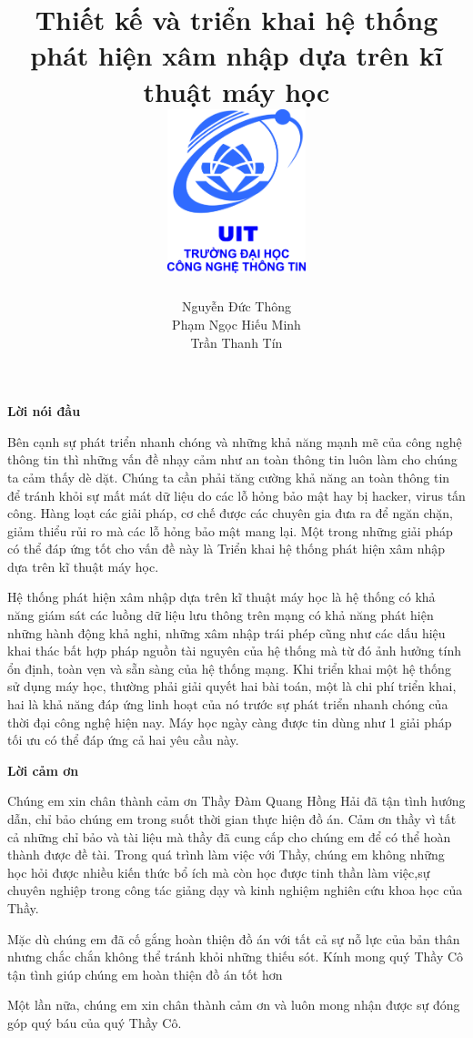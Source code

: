 \documentclass[12pt,twoside]{report}
\title{
    {Thiết kế và triển khai hệ thống phát hiện xâm nhập dựa trên kĩ thuật máy học}\\
    {\includegraphics[width=4cm]{logo}}
}
\author{
    Nguyễn Đức Thông
    \\
    Phạm Ngọc Hiếu Minh
    \\
    Trần Thanh Tín
}
\begin{document}

\newpage
\begin{center}
	{\LARGE \textbf{Lời nói đầu}}
\end{center}
Bên cạnh sự phát triển nhanh chóng và những khả năng mạnh mẽ của công nghệ thông tin thì những vấn đề nhạy cảm như
an toàn thông tin luôn làm cho chúng ta cảm thấy dè dặt. Chúng ta cần phải tăng cường khả năng an toàn thông tin để tránh
khỏi sự mất mát dữ liệu do các lỗ hỏng bảo mật hay bị hacker, virus tấn công. Hàng loạt các giải pháp, cơ chế được các
chuyên gia đưa ra để ngăn chặn, giảm thiểu rủi ro mà các lỗ hỏng bảo mật mang lại. Một trong những giải pháp có thể
đáp ứng tốt cho vấn đề này là Triển khai hệ thống phát hiện xâm nhập dựa trên kĩ thuật máy học.
\par
Hệ thống phát hiện xâm nhập dựa trên kĩ thuật máy học là hệ thống có khả năng giám sát các luồng dữ liệu lưu thông trên mạng
có khả năng phát hiện những hành động khả nghi, những xâm nhập trái phép cũng như các dấu hiệu khai thác bất hợp pháp
nguồn tài nguyên của hệ thống mà từ đó ảnh hưởng tính ổn định, toàn vẹn và sẵn sàng của hệ thống mạng.
Khi triển khai một hệ thống sử dụng máy học, thường phải giải quyết hai bài toán, một là chi phí triển khai,
hai là khả năng đáp ứng linh hoạt của nó trước sự phát triển nhanh chóng của thời đại công nghệ hiện nay.
Máy học ngày càng được tin dùng như 1 giải pháp tối ưu có thể đáp ứng cả hai yêu cầu này.
\newpage
\begin{center}
	{\LARGE \textbf{Lời cảm ơn}}
\end{center}
\par
Chúng em xin chân thành cảm ơn Thầy Đàm Quang Hồng Hải đã tận tình hướng dẫn, chỉ bảo chúng em trong suốt thời gian thực hiện đồ án. Cảm ơn thầy vì tất cả những chỉ bảo và tài liệu mà thầy đã cung cấp cho chúng em để có thể hoàn thành được đề tài. Trong quá trình làm việc với Thầy, chúng em không những học hỏi được nhiều kiến thức bổ ích mà còn học được tinh thần làm việc,sự chuyên nghiệp trong công tác giảng dạy và kinh nghiệm nghiên cứu khoa học của Thầy.
\par
Mặc dù chúng em đã cố gắng hoàn thiện đồ án với tất cả sự nỗ lực của bản thân nhưng chắc chắn không thể tránh khỏi những thiếu sót. Kính mong quý Thầy Cô tận tình giúp chúng em hoàn thiện đồ án tốt hơn
\par
Một lần nữa, chúng em xin chân thành cảm ơn và luôn mong nhận được sự đóng góp quý báu của quý Thầy Cô.
\end{document}
